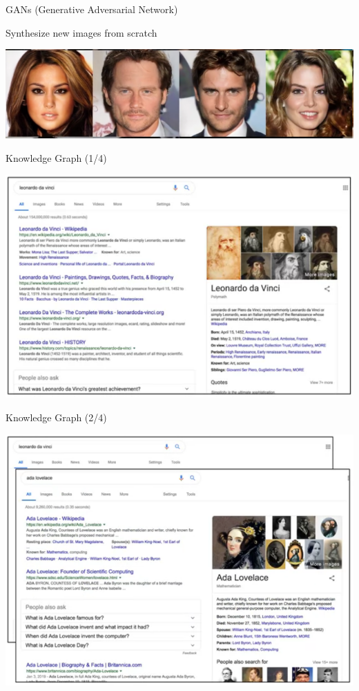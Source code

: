 \documentclass[pdf]{beamer}
\theoremstyle{mystyle}
\begin{document}
\begin{frame}{GANs (Generative Adversarial Network)}
	\begin{center}
		Synthesize new images from scratch~\citep{karras2017progressive}
	\end{center}
	\begin{center}
		\includegraphics[scale=.25]{GANs}
	\end{center}		
\end{frame}

\begin{frame}{Knowledge Graph (1/4)}
	\begin{center}
		\includegraphics[scale=.35]{leonardo-da-vinci}
	\end{center}
	
\end{frame}

\begin{frame}{Knowledge Graph (2/4)}
	\begin{center}
		\includegraphics[scale=.35]{ada-lovelace}
	\end{center}	
\end{frame}
\end{document}
